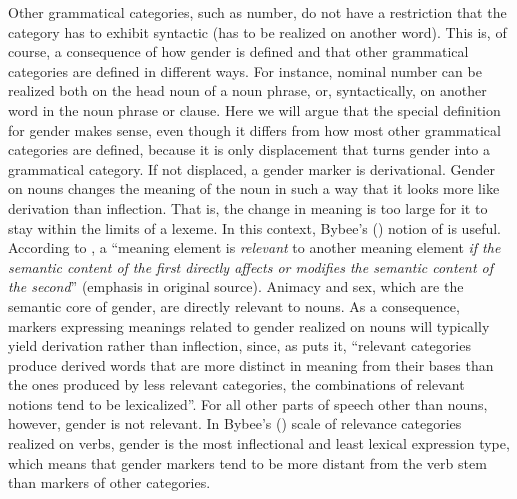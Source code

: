 \documentclass[output=collectionpaper]{langsci/langscibook}
\begin{document}
Other grammatical categories, such as number, do not have a restriction that the category has to exhibit syntactic  (has to be realized on another word). This is, of course, a consequence of how gender is defined and that other grammatical categories are defined in different ways. For instance, nominal number can be realized both on the head noun of a noun phrase, or, syntactically, on another word in the noun phrase or clause. Here we will argue that the special definition for gender makes sense, even though it differs from how most other grammatical categories are defined, because it is only displacement that turns gender into a grammatical category. If not displaced, a gender marker is derivational. Gender on nouns changes the meaning of the noun in such a way that it looks more like derivation than inflection. That is, the change in meaning is too large for it to stay within the limits of a lexeme. In this context, Bybee's (\citealt*{Bybee1985a}) notion of  is useful. According to \cite[13]{Bybee1985a}, a ``meaning element is \emph{relevant} to another meaning element \emph{if the semantic content of the first directly affects or modifies the semantic content of the second}'' (emphasis in original source). Animacy and sex, which are the semantic core of gender, are directly relevant to nouns. As a consequence, markers expressing meanings related to gender realized on nouns will typically yield derivation rather than inflection, since, as \cite[17]{Bybee1985a} puts it, ``relevant categories produce derived words that are more distinct in meaning from their bases than the ones produced by less relevant categories, the combinations of relevant notions tend to be lexicalized''. For all other parts of speech other than nouns, however, gender is not relevant. In Bybee's (\citealt*{Bybee1985a}) scale of relevance categories realized on verbs, gender is the most inflectional and least lexical expression type, which means that gender markers tend to be more distant from the verb stem than markers of other categories.
\end{document}

